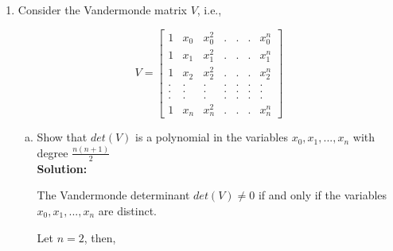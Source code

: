 \documentclass{article}
\begin{document}
\begin{enumerate}
\item Consider the Vandermonde matrix $V$, i.e.,

    $$ V = 
    \begin{bmatrix}
        1 & x_{0} & x_{0}^{2} & . & . & . & x_{0}^{n}\\
        1 & x_{1} & x_{1}^{2} & . & . & . & x_{1}^{n}\\
        1 & x_{2} & x_{2}^{2} & . & . & . & x_{2}^{n}\\
        . & .     & .         & . & . & . & . \\
        . & .     & .         & . & . & . & . \\
        . & .     & .         & . & . & . & . \\
        1 & x_{n} & x_{n}^{2} & . & . & . & x_{n}^{n} 
    \end{bmatrix}
    $$



\begin{enumerate}[(a)]  
\item Show that $det(V)$ is a polynomial in the variables $x_{0}, x_{1}, ..., x_{n}$ with degree $\displaystyle \frac{n(n+1)}{2}$ \\

\textbf{Solution:}

        The Vandermonde determinant $det(V) \neq 0$ if and only if the variables $x_{0}, x_{1}, ..., x_{n}$ are distinct.

        Let $n = 2$, then,


\end{enumerate}
\end{enumerate}
\end{document}
